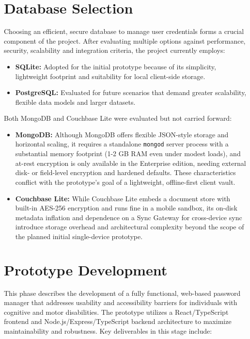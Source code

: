 \section{Database Selection}
\label{sec:database-selection}
Choosing an efficient, secure database to manage user credentials forms a crucial component of the project. After evaluating multiple options against performance, security, scalability and integration criteria, the project currently employs:

\begin{itemize}
  \item \textbf{SQLite:} Adopted for the initial prototype because of its simplicity, lightweight footprint and suitability for local client-side storage.
  \item \textbf{PostgreSQL:} Evaluated for future scenarios that demand greater scalability, flexible data models and larger datasets.
\end{itemize}

Both MongoDB and Couchbase Lite were evaluated but not carried forward:

\begin{itemize}
  \item \textbf{MongoDB:} Although MongoDB offers flexible JSON-style storage and horizontal scaling, it requires a standalone \texttt{mongod} server process with a substantial memory footprint (1-2 GB RAM even under modest loads), and at-rest encryption is only available in the Enterprise edition, needing external disk- or field-level encryption and hardened defaults. These characteristics conflict with the prototype's goal of a lightweight, offline-first client vault.
  \item \textbf{Couchbase Lite:} While Couchbase Lite embeds a document store with built-in AES-256 encryption and runs fine in a mobile sandbox, its on-disk metadata inflation and dependence on a Sync Gateway for cross-device sync introduce storage overhead and architectural complexity beyond the scope of the planned initial single-device prototype.
\end{itemize}

\section{Prototype Development}
This phase describes the development of a fully functional, web-based password manager that addresses usability and accessibility barriers for individuals with cognitive and motor disabilities. The prototype utilizes a React/TypeScript frontend and Node.js/Express/TypeScript backend architecture to maximize maintainability and robustness. Key deliverables in this stage include:

